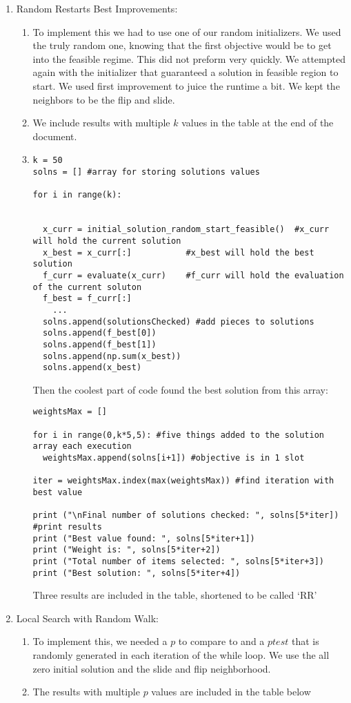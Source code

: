 \documentclass[11pt]{article}
\begin{document}
\begin{enumerate}
\item Random Restarts Best Improvements:  
\begin{enumerate}
\item To implement this we had to use one of our random initializers. We used the truly random one, knowing that the first objective would be to get into the feasible regime.  This did not preform very quickly.  We attempted again with the initializer that guaranteed a solution in feasible region to start.  We used first improvement to juice the runtime a bit. We kept the neighbors to be the flip and slide. 

\item We include results with multiple $k$ values in the table at the end of the document.

\item 
\begin{verbatim}
k = 50
solns = [] #array for storing solutions values

for i in range(k):


  x_curr = initial_solution_random_start_feasible()  #x_curr will hold the current solution
  x_best = x_curr[:]           #x_best will hold the best solution
  f_curr = evaluate(x_curr)    #f_curr will hold the evaluation of the current soluton
  f_best = f_curr[:]
	...
  solns.append(solutionsChecked) #add pieces to solutions
  solns.append(f_best[0])
  solns.append(f_best[1])
  solns.append(np.sum(x_best))
  solns.append(x_best)
\end{verbatim}
Then the coolest part of code found the best solution from this array:
\begin{verbatim}
weightsMax = []

for i in range(0,k*5,5): #five things added to the solution array each execution
  weightsMax.append(solns[i+1]) #objective is in 1 slot

iter = weightsMax.index(max(weightsMax)) #find iteration with best value

print ("\nFinal number of solutions checked: ", solns[5*iter]) #print results
print ("Best value found: ", solns[5*iter+1])
print ("Weight is: ", solns[5*iter+2])
print ("Total number of items selected: ", solns[5*iter+3])
print ("Best solution: ", solns[5*iter+4])
\end{verbatim}
Three results are included in the table, shortened to be called `RR'
\end{enumerate}
\item Local Search with Random Walk: 
\begin{enumerate}
\item To implement this, we needed a $p$ to compare to and a $ptest$ that is randomly generated in each iteration of the while loop.  We use the all zero initial solution and the slide and flip neighborhood.  
\item The results with multiple $p$ values are included in the table below


\end{enumerate}
\end{enumerate}
\end{document}

